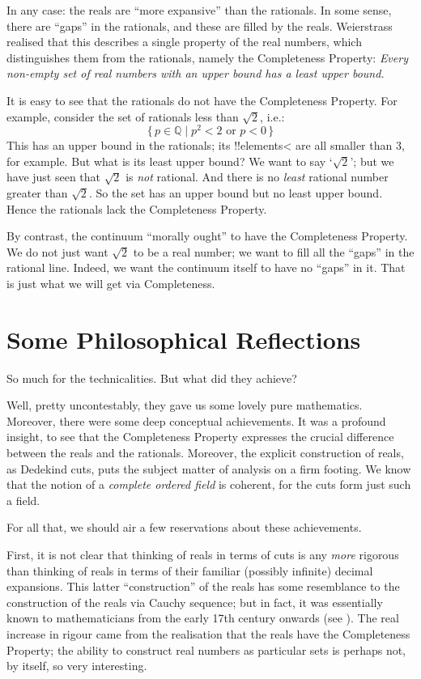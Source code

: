 \documentclass[10pt,a4paper]{article}
\makeatletter
\theoremstyle{plain}
\theoremstyle{definition}
\theoremstyle{remark}
\newcommand*{\olfileid}[3]{}
\newcommand*{\olsection}[1]{\section*{#1}}
\newcommand{\olref}{\@ifnextchar[{\olref@i}{\olref@final}}
\def\olref@i[#1]{\@ifnextchar[{\olref@ii}{\olref@final}}
\def\olref@ii[#1]{\@ifnextchar[{\olref@iii}{\olref@final}}
\def\olref@iii[#1]{\olref@final}
\def\olref@final#1{\ref{#1}}
\providecommand{\Rat}{\mathbb{Q}}
\providecommand{\Setabs}[2]{\{\, #1 \mid #2 \,\}}
\makeatother
\begin{document}
In any case: the reals are ``more expansive'' than the rationals. In some sense, there are ``gaps'' in the rationals, and these are filled by the reals. Weierstrass realised that this describes a single property of the real numbers, which distinguishes them from the rationals, namely the Completeness Property: \emph{Every non-empty set of real numbers with an upper bound has a least upper bound.} 

It is easy to see that the rationals do not have the Completeness Property. For example, consider the set of rationals less than $\sqrt{2}$, i.e.:
\[
	\Setabs{p \in \Rat}{p^2 < 2 \text{ or }p < 0}
\]
This has an upper bound in the rationals; its !!{element}s< are all  smaller than $3$, for example. But what is its least upper bound? We want to say `$\sqrt{2}$'; but we have just seen that $\sqrt{2}$ is \emph{not} rational. And there is no \emph{least} rational number greater than $\sqrt{2}$. So the set has an upper bound but no least upper bound. Hence the rationals lack the Completeness Property.

By contrast, the continuum ``morally ought'' to have the Completeness Property. We do not just want $\sqrt{2}$ to be a real number; we want to fill all the ``gaps'' in the rational line. Indeed, we want the continuum itself to have no ``gaps'' in it. That is just what we will get via Completeness.




\olfileid{sfr}{arith}{ref}
\olsection{Some Philosophical Reflections}

So much for the technicalities. But what did they achieve?

Well, pretty uncontestably, they gave us some {lovely} pure mathematics. Moreover,
there were some deep conceptual achievements. It was a profound
insight, to see that the Completeness Property expresses the crucial
difference between the reals and the rationals. Moreover, the explicit
construction of reals, as Dedekind cuts, puts the subject matter of
analysis on a firm footing. We know that the notion of a
\emph{complete ordered field} is coherent, for the cuts form just such
a field. 

For all that, we should air a few reservations about these achievements. 

First, it is not clear that thinking of reals in terms of cuts is any
\emph{more} rigorous than thinking of reals in terms of their familiar
(possibly infinite) decimal expansions. This latter ``construction''
of the reals has some resemblance to the construction of the reals via
Cauchy sequence; but in fact, it was essentially known to
mathematicians from the early 17th century onwards (see
\olref[cauchy]{sec}). The real increase in rigour came from the
realisation that the reals have the Completeness Property; the ability
to construct real numbers as particular sets is perhaps not, by
itself, so very interesting.
\end{document}

